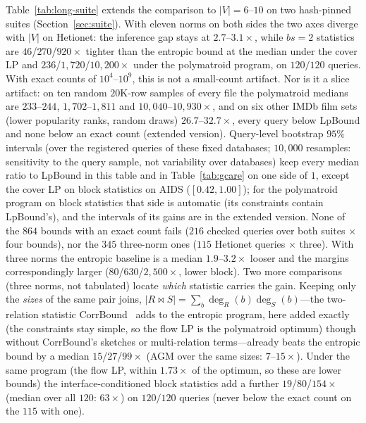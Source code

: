 \documentclass[conference]{IEEEtran}
\begin{document}
Table~\ref{tab:long-suite} extends the comparison to $|V|{=}6$--$10$ on two hash-pinned suites (Section~\ref{sec:suite}). With eleven norms on both sides the two axes
diverge with $|V|$ on Hetionet: the inference gap stays at
$2.7$--$3.1\times$, while $bs{=}2$ statistics are $46$/$270$/$920\times$
tighter than the entropic bound at the median under the cover LP and
$236$/$1{,}720$/$10{,}200\times$ under the polymatroid program, on
$120/120$ queries.
With exact counts of $10^{4}$--$10^{9}$, this is not a small-count artifact. Nor is it a slice artifact: on ten random $20$K-row samples of every file the polymatroid medians are $233$--$244$, $1{,}702$--$1{,}811$ and $10{,}040$--$10{,}930\times$, and on six other IMDb film sets (lower popularity ranks, random draws) $26.7$--$32.7\times$, every query below LpBound and none below an exact count (extended version). Query-level bootstrap $95\%$ intervals (over the registered queries of these fixed databases; $10{,}000$
resamples: sensitivity to the query sample, not variability over databases) keep every median ratio to LpBound in this table and in
Table~\ref{tab:gcare} on one side of $1$, except the cover LP on block
statistics on AIDS ($[0.42, 1.00]$); for the polymatroid program on block statistics that side is automatic (its constraints contain LpBound's), and the intervals of its gains are in the extended version. None of the $864$ bounds with an exact count
fails ($216$ checked queries over both suites ${\times}$ four bounds), nor
the $345$ three-norm ones ($115$ Hetionet queries ${\times}$ three). With
three norms the entropic baseline is a median $1.9$--$3.2\times$ looser
and the margins correspondingly larger ($80$/$630$/$2{,}500\times$, lower
block). Two more comparisons (three norms, not tabulated) locate \emph{which} statistic
carries the gain. Keeping only the \emph{sizes} of the same
pair joins, $|R\bowtie S| = \sum_b \deg_R(b)\deg_S(b)$---the
two-relation statistic CorrBound~\cite{mayer2026corrbound} adds to the
entropic program, here added exactly (the constraints stay simple, so the
flow LP is the polymatroid optimum) though without CorrBound's sketches
or multi-relation terms---already beats the entropic bound by a median
$15$/$27$/$99\times$ (AGM over the same sizes: $7$--$15\times$). Under
the same program (the flow LP, within $1.73\times$ of the optimum, so
these are lower bounds) the interface-conditioned block statistics add
a further $19$/$80$/$154\times$ (median over all $120$: $63\times$) on $120/120$ queries (never below the
exact count on the $115$ with one).
\end{document}
